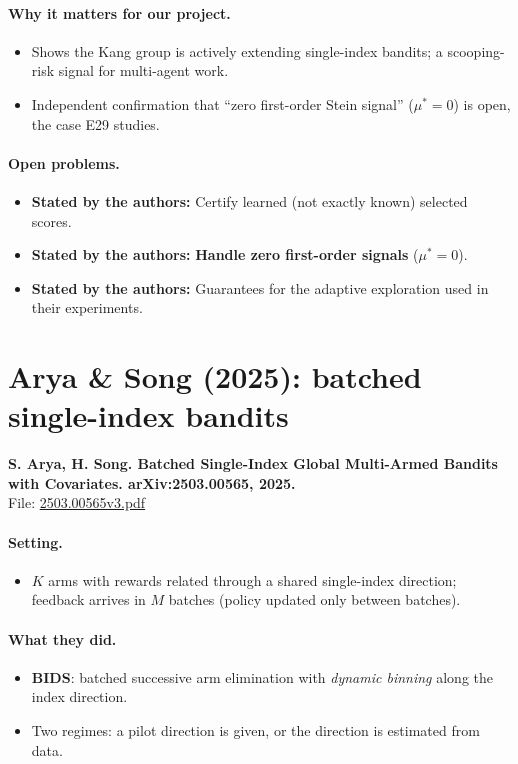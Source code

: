 \documentclass[11pt]{article}
\newcommand{\stated}{\textcolor{green!40!black}{\textbf{Stated by the authors:}}}
\newcommand{\file}[1]{\url{#1}}
\begin{document}
\paragraph{Why it matters for our project.}
\begin{itemize}\item Shows the Kang group is actively extending single-index bandits; a scooping-risk signal for multi-agent work.\item Independent confirmation that ``zero first-order Stein signal'' ($\mu^*=0$) is open, the case E29 studies.\end{itemize}
\paragraph{Open problems.}
\begin{itemize}\item \stated{} Certify learned (not exactly known) selected scores.\item \stated{} \textbf{Handle zero first-order signals} ($\mu^*=0$).\item \stated{} Guarantees for the adaptive exploration used in their experiments.\end{itemize}
\section{Arya \& Song (2025): batched single-index bandits}
\textbf{S. Arya, H. Song. Batched Single-Index Global Multi-Armed Bandits with Covariates. arXiv:2503.00565, 2025.}\\ File: \file{2503.00565v3.pdf}
\paragraph{Setting.}
\begin{itemize}\item $K$ arms with rewards related through a shared single-index direction; feedback arrives in $M$ batches (policy updated only between batches).\end{itemize}
\paragraph{What they did.}
\begin{itemize}\item \textbf{BIDS}: batched successive arm elimination with \emph{dynamic binning} along the index direction.\item Two regimes: a pilot direction is given, or the direction is estimated from data.\end{itemize}
\end{document}
